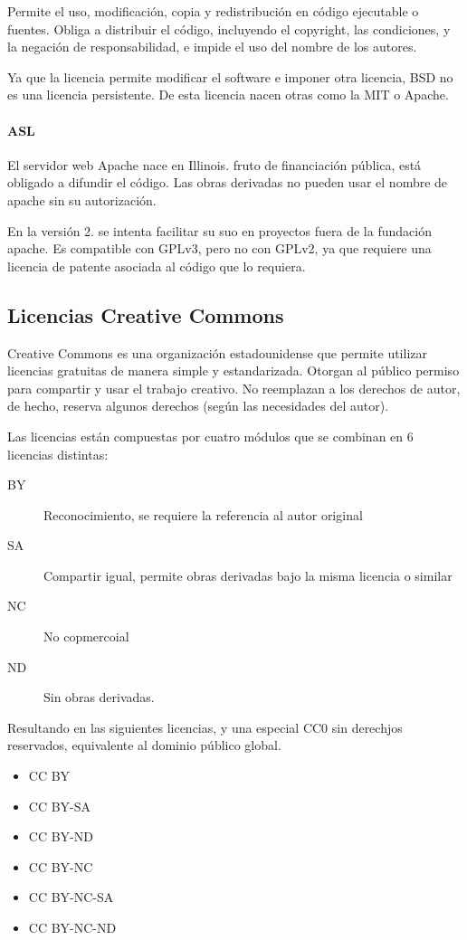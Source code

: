             Permite el uso, modificación, copia y redistribución en código ejecutable o fuentes. Obliga a distribuir el código, incluyendo el copyright, las condiciones, y la negación de responsabilidad, e impide el uso del nombre de los autores.

            Ya que la licencia permite modificar el software e imponer otra licencia, BSD no es una licencia persistente. De esta licencia nacen otras como la MIT o Apache.

        \paragraph{ASL}
            El servidor web Apache nace en Illinois. fruto de financiación pública, está obligado a difundir el código. Las obras derivadas no pueden usar el nombre de apache sin su autorización.

            En la versión 2. se intenta facilitar su suo en proyectos fuera de la fundación apache. Es compatible con GPLv3, pero no con GPLv2, ya que requiere una licencia de patente asociada al código que lo requiera.

\subsection{Licencias Creative Commons}
    Creative Commons es una organización estadounidense que permite utilizar licencias gratuitas de manera simple y estandarizada. Otorgan al público permiso para compartir y usar el trabajo creativo. No reemplazan a los derechos de autor, de hecho, reserva algunos derechos (según las necesidades del autor).

    Las licencias están compuestas por cuatro módulos que se combinan en 6 licencias distintas:
    \begin{description}
        \item[BY] Reconocimiento, se requiere la referencia al autor original
        \item[SA] Compartir igual, permite obras derivadas bajo la misma licencia o similar
        \item[NC] No copmercoial
        \item[ND] Sin obras derivadas.
    \end{description}

    Resultando en las siguientes licencias, y una especial CC0 sin derechjos reservados, equivalente al dominio público global.
    \begin{itemize}
        \item CC BY 
        \item CC BY-SA
        \item CC BY-ND
        \item CC BY-NC
        \item CC BY-NC-SA
        \item CC BY-NC-ND
    \end{itemize}

